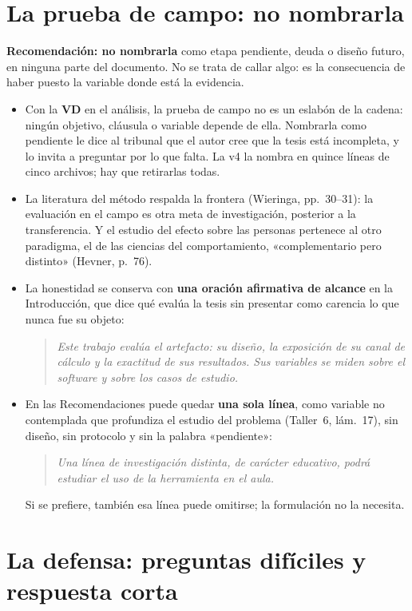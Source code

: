 \documentclass[11pt,a4paper]{article}
\newcommand{\vd}{\textbf{VD}}
\newcommand{\pegar}[1]{\begin{quote}\itshape #1\end{quote}}
\begin{document}
\section{La prueba de campo: no nombrarla}
\label{sec:campo}

\textbf{Recomendación: no nombrarla} como etapa pendiente, deuda o diseño futuro, en ninguna parte del documento. No se trata de callar algo: es la consecuencia de haber puesto la variable donde está la evidencia.

\begin{itemize}
\item Con la \vd{} en el análisis, la prueba de campo no es un eslabón de la cadena: ningún objetivo, cláusula o variable depende de ella. Nombrarla como pendiente le dice al tribunal que el autor cree que la tesis está incompleta, y lo invita a preguntar por lo que falta. La v4 la nombra en quince líneas de cinco archivos; hay que retirarlas todas.
\item La literatura del método respalda la frontera (Wieringa, pp.~30--31): la evaluación en el campo es otra meta de investigación, posterior a la transferencia. Y el estudio del efecto sobre las personas pertenece al otro paradigma, el de las ciencias del comportamiento, «complementario pero distinto» (Hevner, p.~76).
\item La honestidad se conserva con \textbf{una oración afirmativa de alcance} en la Introducción, que dice qué evalúa la tesis sin presentar como carencia lo que nunca fue su objeto:
\pegar{Este trabajo evalúa el artefacto: su diseño, la exposición de su canal de cálculo y la exactitud de sus resultados. Sus variables se miden sobre el software y sobre los casos de estudio.}
\item En las Recomendaciones puede quedar \textbf{una sola línea}, como variable no contemplada que profundiza el estudio del problema (Taller~6, lám.~17), sin diseño, sin protocolo y sin la palabra «pendiente»:
\pegar{Una línea de investigación distinta, de carácter educativo, podrá estudiar el uso de la herramienta en el aula.}
Si se prefiere, también esa línea puede omitirse; la formulación no la necesita.
\end{itemize}

\section{La defensa: preguntas difíciles y respuesta corta}
\end{document}
